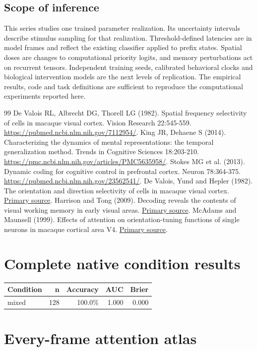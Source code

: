 \documentclass[11pt]{article}
\begin{document}
\subsection{Scope of inference}
This series studies one trained parameter realization. Its uncertainty intervals describe stimulus sampling for that realization. Threshold-defined latencies are in model frames and reflect the existing classifier applied to prefix states. Spatial doses are changes to computational priority logits, and memory perturbations act on recurrent tensors. Independent training seeds, calibrated behavioral clocks and biological intervention models are the next levels of replication. The empirical results, code and task definitions are sufficient to reproduce the computational experiments reported here.

\begin{thebibliography}{99}
 De Valois RL, Albrecht DG, Thorell LG (1982). Spatial frequency selectivity of cells in macaque visual cortex. Vision Research 22:545-559. \url{https://pubmed.ncbi.nlm.nih.gov/7112954/}.
 King JR, Dehaene S (2014). Characterizing the dynamics of mental representations: the temporal generalization method. Trends in Cognitive Sciences 18:203-210. \url{https://pmc.ncbi.nlm.nih.gov/articles/PMC5635958/}.
 Stokes MG et al. (2013). Dynamic coding for cognitive control in prefrontal cortex. Neuron 78:364-375. \url{https://pubmed.ncbi.nlm.nih.gov/23562541/}.
 De Valois, Yund and Hepler (1982). The orientation and direction selectivity of cells in macaque visual cortex. \href{https://pubmed.ncbi.nlm.nih.gov/7112953/}{Primary source}.
 Harrison and Tong (2009). Decoding reveals the contents of visual working memory in early visual areas. \href{https://pubmed.ncbi.nlm.nih.gov/19225460/}{Primary source}.
 McAdams and Maunsell (1999). Effects of attention on orientation-tuning functions of single neurons in macaque cortical area V4. \href{https://pubmed.ncbi.nlm.nih.gov/9870971/}{Primary source}.
\end{thebibliography}\clearpage\appendix\section{Complete native condition results}
\small\begin{longtable}{p{}rrrr}\toprule Condition & n & Accuracy & AUC & Brier\\\midrule\endhead
mixed & 128 & 100.0\% & 1.000 & 0.000\\
\bottomrule\end{longtable}\normalsize\section{Every-frame attention atlas}
\end{document}

